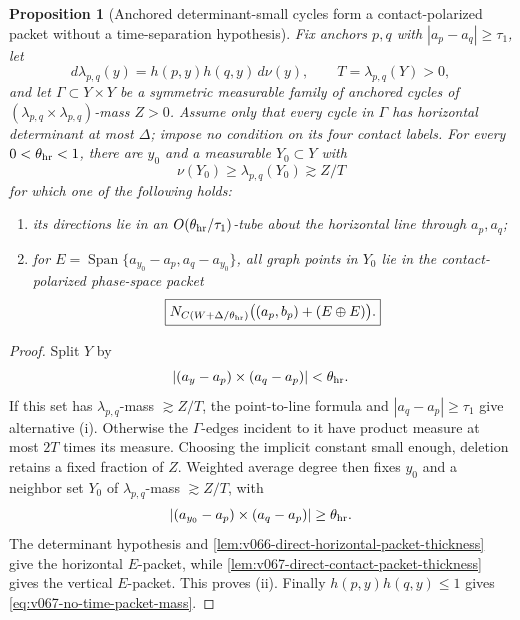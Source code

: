 \documentclass[10pt]{article}
\newtheorem{proposition}[theorem]{Proposition}
\begin{document}
\begin{proposition}[Anchored determinant-small cycles form a contact-polarized packet without a
time-separation hypothesis]
\label{prop:v067-no-time-anchored-packet}
Fix anchors \(p,q\) with \(|a_p-a_q|\ge\tau_1\), let
\[
d\lambda_{p,q}(y)=h(p,y)h(q,y)\,d\nu(y),
\qquad
T=\lambda_{p,q}(Y)>0,
\]
and let \(\Gamma\subset Y\times Y\) be a symmetric measurable family of anchored cycles of
\((\lambda_{p,q}\times\lambda_{p,q})\)-mass \(Z>0\).  Assume only that every cycle in \(\Gamma\)
has horizontal determinant at most \(\Delta\); impose no condition on its four contact labels.
For every \(0<\theta_{\rm hr}<1\), there are \(y_0\) and a measurable \(Y_0\subset Y\) with
\begin{equation}
\label{eq:v067-no-time-packet-mass}
\boxed{
\nu(Y_0)\ge\lambda_{p,q}(Y_0)
\gtrsim Z/T
}
\end{equation}
for which one of the following holds:
\begin{enumerate}[label=\textnormal{(\roman*)}]
\item its directions lie in an
  \(O(\theta_{\rm hr}/\tau_1)\)-tube about the horizontal line through \(a_p,a_q\);
\item for
  \(E=\operatorname{Span}\{a_{y_0}-a_p,a_q-a_{y_0}\}\), all graph points in \(Y_0\) lie in the
  contact-polarized phase-space packet
  \begin{equation}
  \label{eq:v067-no-time-contact-polarized-output}
  \boxed{
  N_{C(W+\Delta/\theta_{\rm hr})}
  \bigl((a_p,b_p)+(E\oplus E)\bigr).
  }
  \end{equation}
\end{enumerate}
\end{proposition}

\begin{proof}
Split \(Y\) by
\[
|(a_y-a_p)\times(a_q-a_p)|<\theta_{\rm hr}.
\]
If this set has \(\lambda_{p,q}\)-mass \(\gtrsim Z/T\), the point-to-line formula and
\(|a_q-a_p|\ge\tau_1\) give alternative \textnormal{(i)}.  Otherwise the \(\Gamma\)-edges incident
to it have product measure at most \(2T\) times its measure.  Choosing the implicit constant small
enough, deletion retains a fixed fraction of \(Z\).  Weighted average degree then fixes
\(y_0\) and a neighbor set \(Y_0\) of \(\lambda_{p,q}\)-mass \(\gtrsim Z/T\), with
\[
|(a_{y_0}-a_p)\times(a_q-a_p)|
\ge\theta_{\rm hr}.
\]
The determinant hypothesis and
\cref{lem:v066-direct-horizontal-packet-thickness} give the horizontal \(E\)-packet, while
\cref{lem:v067-direct-contact-packet-thickness} gives the vertical \(E\)-packet.  This proves
\textnormal{(ii)}.  Finally \(h(p,y)h(q,y)\le1\) gives
\eqref{eq:v067-no-time-packet-mass}.
\end{proof}
\end{document}
